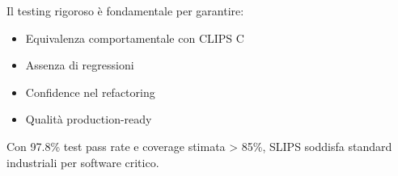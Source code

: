 Il testing rigoroso è fondamentale per garantire:
\begin{itemize}
\item Equivalenza comportamentale con CLIPS C
\item Assenza di regressioni
\item Confidence nel refactoring
\item Qualità production-ready
\end{itemize}

\begin{successbox}
Con 97.8\% test pass rate e coverage stimata > 85\%, SLIPS soddisfa standard industriali per software critico.
\end{successbox}

